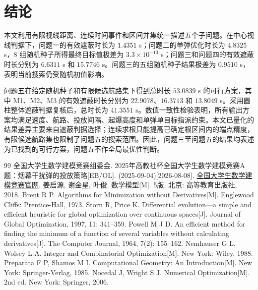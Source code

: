 \documentclass[UTF8,a4paper,12pt,fontset=windows]{ctexart}
\begin{document}
\section{结论}

本文利用有限视线距离、连续时间事件和区间并集统一描述五个子问题。在中心视线判据下，问题一的有效遮蔽时长为 $1.4351$ s；问题二的单弹优化时长为 $4.8325$ s，8 组随机种子所得最终目标值极差为 $3.3\times10^{-13}$ s；问题三和问题四的有效遮蔽时长分别为 $6.6311$ s 和 $15.7746$ s。问题三的五组随机种子结果极差为 $0.9510$ s，表明当前搜索仍受随机初值影响。

问题五在给定随机种子和有限候选航路集下得到总时长 $53.0839$ s 的可行方案，其中 M1、M2、M3 的有效遮蔽时长分别为 $22.9078$、$16.3713$ 和 $13.8049$ s。采用圆柱整体遮蔽判据复核后，总时长为 $41.3551$ s。数值一致性检验表明，所有输出方案均满足速度、航路、投放间隔、起爆高度和单弹单目标指派约束。本文已量化的结果差异主要来自遮蔽判据选择；连续求根只能提高已确定根区间内的端点精度，有限候选航路集也限制了问题五的搜索范围。因此，问题三至问题五的结果均表述为已找到的可行方案，问题五不作全局最优性判断。

\begin{thebibliography}{99}
\fontsize{8pt}{9.2pt}\selectfont
\setlength{\itemsep}{0pt}
\setlength{\parsep}{0pt}
\setlength{\parskip}{0pt}
 全国大学生数学建模竞赛组委会. 2025年高教社杯全国大学生数学建模竞赛A题：烟幕干扰弹的投放策略[EB/OL]. (2025-09-04)[2026-08-08]. \href{https://www.mcm.edu.cn/html_cn/node/03c91a444e62eee81a3740fa97a461a6.html}{全国大学生数学建模竞赛官网}.
 姜启源, 谢金星, 叶俊. 数学模型[M]. 5版. 北京: 高等教育出版社, 2018.
 Brent R P. Algorithms for Minimization without Derivatives[M]. Englewood Cliffs: Prentice-Hall, 1973.
 Storn R, Price K. Differential evolution---a simple and efficient heuristic for global optimization over continuous spaces[J]. Journal of Global Optimization, 1997, 11: 341--359.
 Powell M J D. An efficient method for finding the minimum of a function of several variables without calculating derivatives[J]. The Computer Journal, 1964, 7(2): 155--162.
 Nemhauser G L, Wolsey L A. Integer and Combinatorial Optimization[M]. New York: Wiley, 1988.
 Preparata F P, Shamos M I. Computational Geometry: An Introduction[M]. New York: Springer-Verlag, 1985.
 Nocedal J, Wright S J. Numerical Optimization[M]. 2nd ed. New York: Springer, 2006.
\end{thebibliography}

\clearpage
\end{document}
